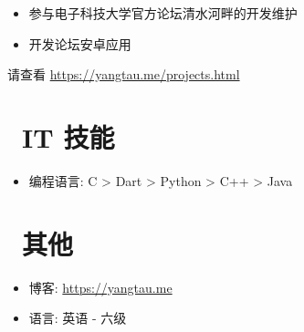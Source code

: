\documentclass{resume}
\begin{document}
\begin{onehalfspacing}
\begin{itemize}
  \item 参与电子科技大学官方论坛清水河畔的开发维护
  \item 开发论坛安卓应用
\end{itemize}
\end{onehalfspacing}


\begin{onehalfspacing}
请查看 \url{https://yangtau.me/projects.html}
\end{onehalfspacing}


\section{\faCogs\ IT 技能}
\begin{itemize}[parsep=0.5ex]
  \item 编程语言: C > Dart > Python > C++ > Java
\end{itemize}

\section{\faInfo\ 其他}
\begin{itemize}[parsep=0.5ex]
  \item 博客: \url{https://yangtau.me}
  \item 语言: 英语 - 六级
\end{itemize}

%
%
\end{document}
